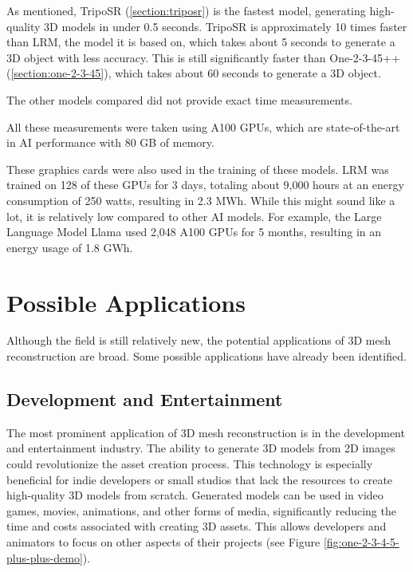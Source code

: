 As mentioned, TripoSR (\ref{section:triposr}) is the fastest model, generating high-quality 3D models in under 0.5 seconds.
TripoSR is approximately 10 times faster than LRM, the model it is based on, which takes about 5 seconds to generate a 3D object with less accuracy.
This is still significantly faster than One-2-3-45++ (\ref{section:one-2-3-45}), which takes about 60 seconds to generate a 3D object.

The other models compared did not provide exact time measurements.

All these measurements were taken using A100 GPUs, which are state-of-the-art in AI performance with 80 GB of memory.

These graphics cards were also used in the training of these models. LRM was trained on 128 of these GPUs for 3 days, totaling about 9,000 hours at an energy consumption of 250 watts, resulting in 2.3 MWh.
While this might sound like a lot, it is relatively low compared to other AI models.
For example, the Large Language Model Llama \autocite{touvron_llama_2023} used 2,048 A100 GPUs for 5 months, resulting in an energy usage of 1.8 GWh.

\section{Possible Applications}
Although the field is still relatively new, the potential applications of 3D mesh reconstruction are broad. Some possible applications have already been identified.

\subsection{Development and Entertainment}
The most prominent application of 3D mesh reconstruction is in the development and entertainment industry. The ability to generate 3D models from 2D images could revolutionize the asset creation process.
This technology is especially beneficial for indie developers or small studios that lack the resources to create high-quality 3D models from scratch. Generated models can be used in video games, movies, animations, and other forms of media, significantly reducing the time and costs associated with creating 3D assets. This allows developers and animators to focus on other aspects of their projects (see Figure \ref{fig:one-2-3-4-5-plus-plus-demo}).

